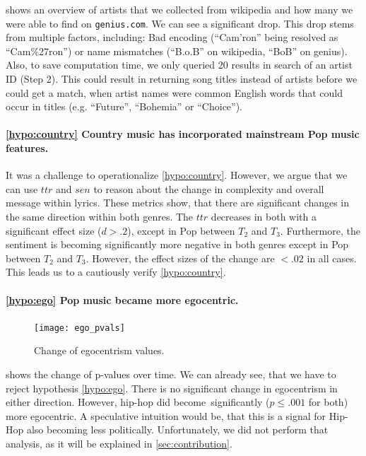 \documentclass[11pt,a4paper]{article}
\begin{document}
 shows an overview of artists that we collected from wikipedia and how many we were able to find on \texttt{genius.com}. We can see a significant drop. This drop stems from multiple factors, including: Bad encoding (\enquote{Cam'ron} being resolved as \enquote{Cam\%27ron}) or name mismatches (\enquote{B.o.B} on wikipedia, \enquote{BoB} on genius). Also, to save computation time, we only queried 20 results in search of an artist ID (Step 2). This could result in returning song titles instead of artists before we could get a match, when artist names were common English words that could occur in titles (e.g. \enquote{Future}, \enquote{Bohemia} or \enquote{Choice}).

\paragraph{\ref{hypo:country} Country music has incorporated mainstream Pop music features.}

It was a challenge to operationalize \ref{hypo:country}. However, we argue that we can use $ttr$ and $sen$ to reason about the change in complexity and overall message within lyrics. These metrics show, that there are significant changes in the same direction within both genres. The $ttr$ decreases in both with a significant effect size ($d > .2$), except in Pop between $T_2$ and $T_3$. Furthermore, the sentiment is becoming significantly more negative in both genres except in Pop between $T_2$ and $T_3$. However, the effect sizes of the change are $<.02$ in all cases. This leads us to a cautiously verify \ref{hypo:country}. 

\paragraph{\ref{hypo:ego} Pop music became more egocentric.}
\begin{figure}[t!]
	\texttt{[image: ego\_pvals]}
	\caption{Change of egocentrism values.}
	\label{fig:pvals:ego}
\end{figure}

 shows the change of p-values over time. We can already see, that we have to reject hypothesis \ref{hypo:ego}. There is no significant change in egocentrism in either direction. However, hip-hop did become significantly ($p \leq .001$ for both) more egocentric. A speculative intuition would be, that this is a signal for Hip-Hop also becoming less politically. Unfortunately, we did not perform that analysis, as it will be explained in \cref{sec:contribution}. 
\end{document}
